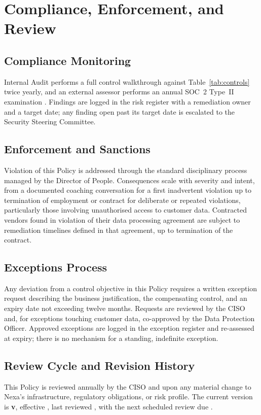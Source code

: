 \section{Compliance, Enforcement, and Review}

\subsection{Compliance Monitoring}
Internal Audit performs a full control walkthrough against Table~\ref{tab:controls}
twice yearly, and an external assessor performs an annual SOC~2 Type~II examination
\cite{soc2}. Findings are logged in the risk register with a remediation owner and a
target date; any finding open past its target date is escalated to the Security Steering
Committee.

\subsection{Enforcement and Sanctions}
Violation of this Policy is addressed through the standard disciplinary process managed
by the Director of People. Consequences scale with severity and intent, from a documented
coaching conversation for a first inadvertent violation up to termination of employment
or contract for deliberate or repeated violations, particularly those involving
unauthorised access to customer data. Contracted vendors found in violation of their data
processing agreement are subject to remediation timelines defined in that agreement, up
to termination of the contract.

\subsection{Exceptions Process}
\label{sec:exceptions}
Any deviation from a control objective in this Policy requires a written exception
request describing the business justification, the compensating control, and an
expiry date not exceeding twelve months. Requests are reviewed by the CISO and, for
exceptions touching customer data, co-approved by the Data Protection Officer. Approved
exceptions are logged in the exception register and re-assessed at expiry; there is no
mechanism for a standing, indefinite exception.

\subsection{Review Cycle and Revision History}
This Policy is reviewed annually by the CISO and upon any material change to Nexa's
infrastructure, regulatory obligations, or risk profile. The current version is
\textbf{v\DocVersion}, effective \textbf{\EffectiveDate}, last reviewed
\textbf{\ReviewedDate}, with the next scheduled review due \textbf{\NextReviewDate}.


